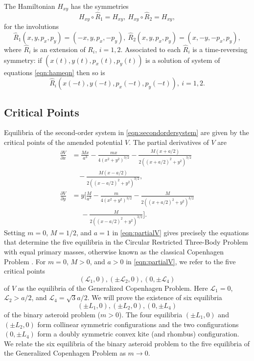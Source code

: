 \documentclass[12pt]{article}
\begin{document}
The Hamiltonian $H_{xy}$ has the symmetries
\[ H_{xy}\circ \hat R_1 = H_{xy},\ H_{xy}\circ \hat R_2 = H_{xy},\]
for the involutions
\[ \hat R_1(x,y,p_x,p_y) = (-x,y,p_x,-p_y),\ \hat R_2(x,y,p_x,p_y) = (x,-y,-p_x,p_y),\]
where $\hat R_i$ is an extension of $R_i$, $i=1,2$. Associated to each $\hat R_i$ is a time-reversing symmetry: if $(x(t),y(t),p_x(t),p_y(t))$ is a solution of system of equations \eqref{eqn:hameqn} then so is
\begin{equation}\label{timereversingsymmetry}
\hat R_i(x(-t),y(-t),p_x(-t),p_y(-t)),\ i=1,2.
\end{equation}



\subsection{Critical Points}
Equilibria of the second-order system in \eqref{eqn:secondordersystem} are given by the critical points of the amended potential $V$. The partial derivatives of $V$ are
\begin{equation}\label{eqn:partialV}
\begin{aligned}
\frac{\partial V}{\partial x}
& = \frac{Mx}{a^3} - \frac{mx}{4(x^2+y^2)^{3/2}} - \frac{M(x+a/2)}{2((x+a/2)^2 + y^2)^{3/2}} \\
& \ \ \ \ - \frac{ M(x-a/2)}{ 2 ((x-a/2)^2 + y^2)^{3/2}}, \\
\frac{\partial V}{\partial y} 
& = y\bigg[ \frac{M}{a^3} - \frac{m}{4(x^2+y^2)^{3/2}} - \frac{M}{2((x+a/2)^2 + y^2)^{3/2}} \\
&\ \ \ \ \ \  - \frac{M}{2((x-a/2)^2 + y^2)^{3/2}}\bigg].
\end{aligned}
\end{equation}
Setting $m=0$, $M=1/2$, and $a=1$ in \eqref{eqn:partialV} gives precisely the equations that determine the five equilibria in the Circular Restricted Three-Body Problem with equal primary masses, otherwise known as the classical Copenhagen Problem \cite{meyerOffin,Szebehely}. For $m=0$, $M>0$, and $a>0$ in \eqref{eqn:partialV}, we refer to the five critical points
\[ ({\mathcal L}_1,0), (\pm{\mathcal L}_2,0),(0,\pm{\mathcal L}_4)\]
of $V$ as the equilibria of the Generalized Copenhagen Problem. Here ${\mathcal L}_1 =0$, ${\mathcal L}_2 > a/2$, and ${\mathcal L}_4 = \sqrt 3 a /2$. We will prove the existence of six equilibria
\[ (\pm L_1,0), (\pm L_2,0),(0,\pm L_4)\]
of the binary asteroid problem ($m>0$). The four equilibria $(\pm L_1,0)$ and $(\pm L_2,0)$ form collinear symmetric configurations and the two configurations $(0,\pm L_4)$ form a doubly symmetric convex kite (and rhombus) configuration. We relate the six equilibria of the binary asteroid problem to the five equilibria of the Generalized Copenhagen Problem as $m\to 0$.
\end{document}

